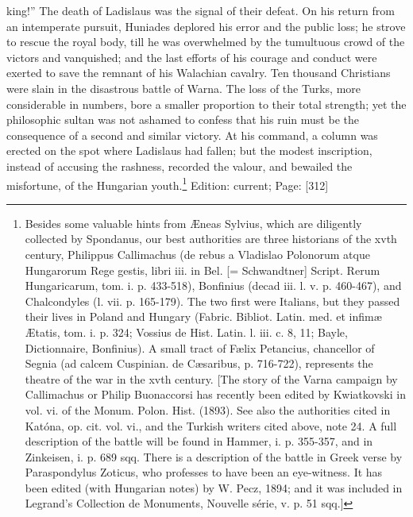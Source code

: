 king!\texthebrew{}” The death of Ladislaus was the signal of their defeat. On his return from an intemperate pursuit, Huniades deplored his error and the public loss; he strove to rescue the royal body, till he was overwhelmed by the tumultuous crowd of the victors and vanquished; and the last efforts of his courage and conduct were exerted to save the remnant of his Walachian cavalry. Ten thousand Christians were slain in the disastrous battle of Warna. The loss of the Turks, more considerable in numbers, bore a smaller proportion to their total strength; yet the philosophic sultan was not ashamed to confess that his ruin must be the consequence of a second and similar victory. At his command, a column was erected on the spot where Ladislaus had fallen; but the modest inscription, instead of accusing the rashness, recorded the valour, and bewailed the misfortune, of the Hungarian youth.\footnote{Besides some valuable hints from Æneas Sylvius, which are diligently collected by Spondanus, our best authorities are three historians of the xvth century, Philippus Callimachus (de rebus a Vladislao Polonorum atque Hungarorum Rege gestis, libri iii. in Bel. [= Schwandtner] Script. Rerum Hungaricarum, tom. i. p. 433-518), Bonfinius (decad iii. l. v. p. 460-467), and Chalcondyles (l. vii. p. 165-179). The two first were Italians, but they passed their lives in Poland and Hungary (Fabric. Bibliot. Latin. med. et infimæ Ætatis, tom. i. p. 324; Vossius de Hist. Latin. l. iii. c. 8, 11; Bayle, Dictionnaire, Bonfinius). A small tract of Fælix Petancius, chancellor of Segnia (ad calcem Cuspinian. de Cæsaribus, p. 716-722), represents the theatre of the war in the xvth century. [The story of the Varna campaign by Callimachus or Philip Buonaccorsi has recently been edited by Kwiatkovski in vol. vi. of the Monum. Polon. Hist. (1893). See also the authorities cited in Katóna, op. cit. vol. vi., and the Turkish writers cited above, note 24. A full description of the battle will be found in Hammer, i. p. 355-357, and in Zinkeisen, i. p. 689 sqq. There is a description of the battle in Greek verse by Paraspondylus Zoticus, who professes to have been an eye-witness. It has been edited (with Hungarian notes) by W. Pecz, 1894; and it was included in Legrand\texthebrew{}’s Collection de Monuments, Nouvelle série, v. p. 51 sqq.]}
Edition: current; Page: [312]

